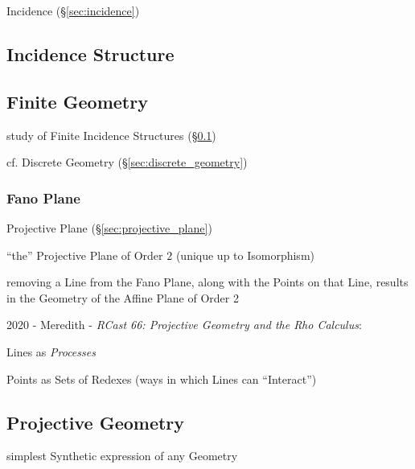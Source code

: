 Incidence (\S\ref{sec:incidence})



\subsection{Incidence Structure}\label{sec:incidence_structure}

\subsection{Finite Geometry}\label{sec:finite_geometry}

study of Finite Incidence Structures (\S\ref{sec:incidence_structure})

cf. Discrete Geometry (\S\ref{sec:discrete_geometry})



\subsubsection{Fano Plane}\label{sec:fano_plane}

Projective Plane (\S\ref{sec:projective_plane})

``the'' Projective Plane of Order $2$ (unique up to Isomorphism)

removing a Line from the Fano Plane, along with the Points on that Line, results
in the Geometry of the Affine Plane of Order 2

2020 - Meredith - \emph{RCast 66: Projective Geometry and the Rho Calculus}:

Lines as \emph{Processes}

Points as Sets of Redexes (ways in which Lines can ``Interact'')



\subsection{Projective Geometry}\label{sec:projective_geometry}

simplest Synthetic expression of any Geometry

